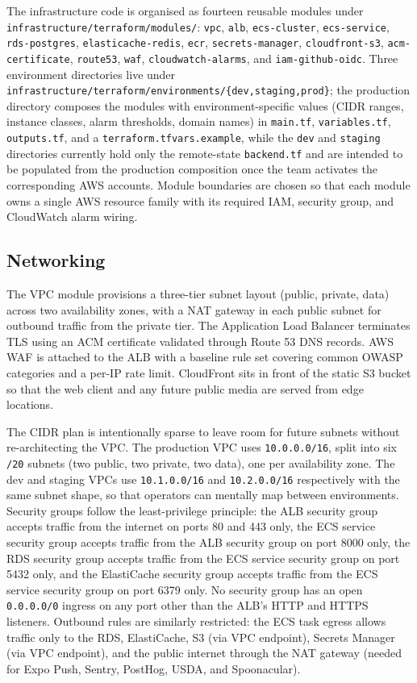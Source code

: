 The infrastructure code is organised as fourteen reusable modules under \texttt{infrastructure/terraform/modules/}: \texttt{vpc}, \texttt{alb}, \texttt{ecs-cluster}, \texttt{ecs-service}, \texttt{rds-postgres}, \texttt{elasticache-redis}, \texttt{ecr}, \texttt{secrets-manager}, \texttt{cloudfront-s3}, \texttt{acm-certificate}, \texttt{route53}, \texttt{waf}, \texttt{cloudwatch-alarms}, and \texttt{iam-github-oidc}. Three environment directories live under \texttt{infrastructure/terraform/environments/\{dev,staging,prod\}}; the production directory composes the modules with environment-specific values (CIDR ranges, instance classes, alarm thresholds, domain names) in \texttt{main.tf}, \texttt{variables.tf}, \texttt{outputs.tf}, and a \texttt{terraform.tfvars.example}, while the \texttt{dev} and \texttt{staging} directories currently hold only the remote-state \texttt{backend.tf} and are intended to be populated from the production composition once the team activates the corresponding AWS accounts. Module boundaries are chosen so that each module owns a single AWS resource family with its required IAM, security group, and CloudWatch alarm wiring.

\subsection{Networking}

The VPC module provisions a three-tier subnet layout (public, private, data) across two availability zones, with a NAT gateway in each public subnet for outbound traffic from the private tier. The Application Load Balancer terminates TLS using an ACM certificate validated through Route 53 DNS records. AWS WAF is attached to the ALB with a baseline rule set covering common OWASP categories and a per-IP rate limit. CloudFront sits in front of the static S3 bucket so that the web client and any future public media are served from edge locations.

The CIDR plan is intentionally sparse to leave room for future subnets without re-architecting the VPC. The production VPC uses \texttt{10.0.0.0/16}, split into six \texttt{/20} subnets (two public, two private, two data), one per availability zone. The dev and staging VPCs use \texttt{10.1.0.0/16} and \texttt{10.2.0.0/16} respectively with the same subnet shape, so that operators can mentally map between environments. Security groups follow the least-privilege principle: the ALB security group accepts traffic from the internet on ports 80 and 443 only, the ECS service security group accepts traffic from the ALB security group on port 8000 only, the RDS security group accepts traffic from the ECS service security group on port 5432 only, and the ElastiCache security group accepts traffic from the ECS service security group on port 6379 only. No security group has an open \texttt{0.0.0.0/0} ingress on any port other than the ALB's HTTP and HTTPS listeners. Outbound rules are similarly restricted: the ECS task egress allows traffic only to the RDS, ElastiCache, S3 (via VPC endpoint), Secrets Manager (via VPC endpoint), and the public internet through the NAT gateway (needed for Expo Push, Sentry, PostHog, USDA, and Spoonacular).

